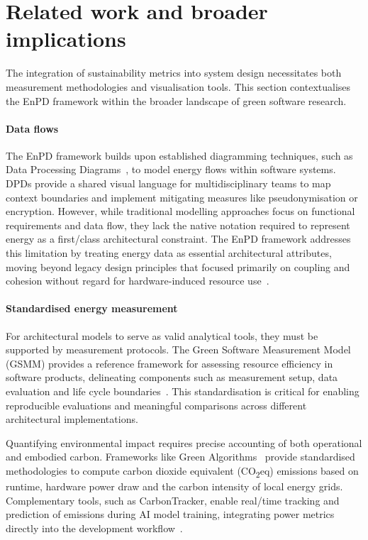 \section{Related work and broader implications}
The integration of sustainability metrics into system design necessitates both measurement methodologies and visualisation tools.
This section contextualises the EnPD framework within the broader landscape of green software research.

\paragraph{Data flows}
The EnPD framework builds upon established diagramming techniques, such as Data Processing Diagrams~\cite{bieker2025data}, to model energy flows within software systems.
DPDs provide a shared visual language for multidisciplinary teams to map context boundaries and implement mitigating measures like pseudonymisation or encryption.
However, while traditional modelling approaches focus on functional requirements and data flow, they lack the native notation required to represent energy as a first\-/class architectural constraint.
The EnPD framework addresses this limitation by treating energy data as essential architectural attributes, moving beyond legacy design principles that focused primarily on coupling and cohesion without regard for hardware-induced resource use~\cite{yourdon1979structured}.

\paragraph{Standardised energy measurement}
For architectural models to serve as valid analytical tools, they must be supported by measurement protocols.
The Green Software Measurement Model (GSMM) provides a reference framework for assessing resource efficiency in software products, delineating components such as measurement setup, data evaluation and life cycle boundaries~\cite{guldner2024development}.
This standardisation is critical for enabling reproducible evaluations and meaningful comparisons across different architectural implementations.

Quantifying environmental impact requires precise accounting of both operational and embodied carbon.
Frameworks like Green Algorithms~\cite{lannelongue2021green} provide standardised methodologies to compute carbon dioxide equivalent (CO\textsubscript{2}eq) emissions based on runtime, hardware power draw and the carbon intensity of local energy grids.
Complementary tools, such as CarbonTracker, enable real\-/time tracking and prediction of emissions during AI model training, integrating power metrics directly into the development workflow~\cite{anthony2020carbontracker}.

